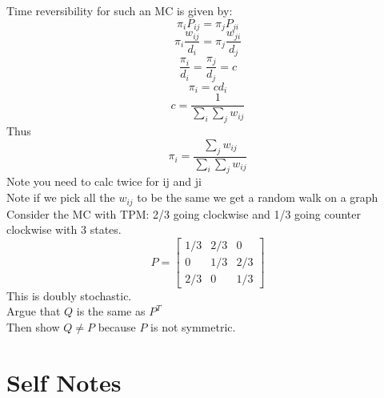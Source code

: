 \documentclass{article}
\begin{document}
Time reversibility for such an MC is given by:
$$\pi_i P_{ij} = \pi_j P_{ji}$$
$$\pi_i \frac{w_{ij}}{d_i} = \pi_j \frac{w_{ji}}{d_j}$$
$$\frac{\pi_i}{d_i} = \frac{\pi_j}{d_j} = c$$
$$ \pi_i = c d_i$$
$$ c = \frac{1}{\sum_i \sum_j w_{ij}}$$
Thus 
$$\pi_i = \frac{\sum_{j}w_{ij}}{\sum_i \sum_j w_{ij}}$$
Note you need to calc twice for ij and ji\\
Note if we pick all the $w_{ij} $ to be the same we get a random walk on a graph\\
Consider the MC with TPM:
2/3 going clockwise and 1/3 going counter clockwise with 3 states.\\
$$P = \begin{bmatrix}
    1/3 & 2/3 & 0 \\
    0 & 1/3 & 2/3 \\
    2/3 & 0 & 1/3
\end{bmatrix}$$
This is doubly stochastic.\\
Argue that $Q$ is the same as $P^T$\\
Then show $Q \neq P$ because $P$ is not symmetric.\\


\newpage
\section*{Self Notes}
\end{document}
